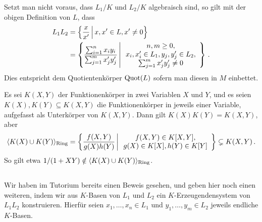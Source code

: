 \begin{remark}
  Setzt man nicht voraus, dass $L_1/K$ und $L_2/K$ algebraisch sind, so gilt mit der obigen Definition von $L$, dass
  \begin{align*}
        L_1 L_2
    &=  \left\{
          \frac{x}{x'}
        \suchthat*
          x, x' \in L,
          x' \neq 0
        \right\}
    \\
    &=  \left\{
          \frac{\sum_{i=1}^n x_i y_i}{\sum_{j=1}^m x'_j y'_j}
        \suchthat*
          \begin{array}{c}
            n, m \geq 0,
          \\
            x_i, x'_i \in L_1,
            y_j, y'_j \in L_2,
          \\
            \sum_{j=1}^m x'_j y'_j \neq 0
          \end{array}
        \right\} \,.
  \end{align*}
  Dies entspricht dem Quotientenkörper $\operatorname{Quot}(L)$ sofern man diesen in $M$ einbettet.
\end{remark}

\begin{example}
  Es sei $K(X,Y)$ der Funktionenkörper in zwei Variablen $X$ und $Y$, und es seien $K(X), K(Y) \subseteq K(X,Y)$ die Funktionenkörper in jeweils einer Variable, aufgefasst als Unterkörper von $K(X,Y)$.
  Dann gilt $K(X) K(Y) = K(X,Y)$, aber
  \begin{align*}
                \generated{ K(X) \cup K(Y) }_{\text{Ring}}
    =           \left\{
                  \frac{f(X,Y)}{g(X)h(Y)}
                \suchthat*
                  \begin{array}{c}
                  f(X,Y) \in K[X,Y],
                  \\
                  g(X) \in K[X],
                  h(Y) \in K[Y]
                  \end{array}
                \right\}
    \subsetneq  K(X,Y) \,.
  \end{align*}
  So gilt etwa $1/(1 + XY) \notin \langle K(X) \cup K(Y) \rangle_{\text{Ring}}$.
\end{example}





\subsection{}

Wir haben im Tutorium bereits einen Beweis gesehen, und geben hier noch einen weiteren, indem wir aus $K$-Basen von $L_1$ und $L_2$ ein $K$-Erzeugendensystem von $L_1 L_2$ konstruieren.
Hierfür seien $x_1, \dotsc, x_n \in L_1$ und $y_1, \dotsc, y_m \in L_2$ jeweils endliche $K$-Basen.

